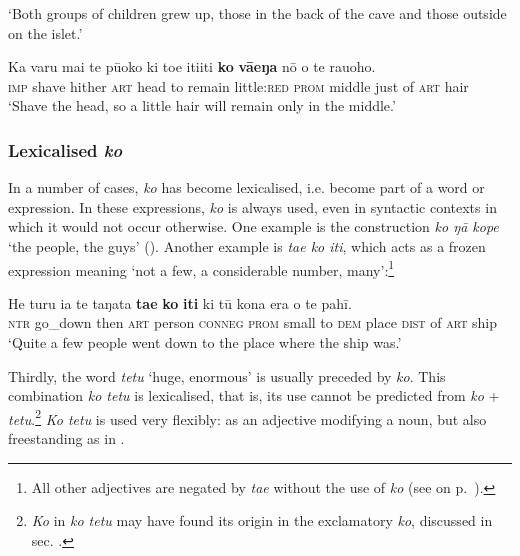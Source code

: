 \glt 
‘Both groups of children grew up, those in the back of the cave and those outside on the islet.’ \textstyleExampleref{[Mtx-3-01.293]}
\z

\ea\label{ex:4.326}
\gll Ka varu mai te pū{\ꞌ}oko ki toe {\ꞌ}iti{\ꞌ}iti \textbf{ko} \textbf{vāeŋa} nō o te rau{\ꞌ}oho. \\
\textsc{imp} shave hither \textsc{art} head to remain little:\textsc{red} \textsc{prom} middle just of \textsc{art} hair \\

\glt 
‘Shave the head, so a little hair will remain only in the middle.’ \textstyleExampleref{[Ley-6-44.033]}
\z

\subsubsection[Lexicalised ko]{Lexicalised \textit{ko}}\label{sec:4.7.11.3}

In a number of cases, \textit{ko} has become lexicalised, i.e. become part of a word or expression. In these expressions, \textit{ko} is always used, even in syntactic contexts in which it would not occur otherwise. One example is the construction \textit{ko ŋā kope} ‘the people, the guys’ (). Another example is \textit{ta{\ꞌ}e ko {\ꞌ}iti}, which acts as a frozen expression meaning ‘not a few, a considerable number, many’:\footnote{\label{fn:242}All other adjectives are negated by \textit{ta{\ꞌ}e} without the use of \textit{ko} (see  on p.~\pageref{ex:10.147}).}

\ea\label{ex:4.327}
\gll He turu ia te taŋata \textbf{ta{\ꞌ}e} \textbf{ko} \textbf{{\ꞌ}iti} ki tū kona era o te pahī. \\
\textsc{ntr} go\_down then \textsc{art} person \textsc{conneg} \textsc{prom} small to \textsc{dem} place \textsc{dist} of \textsc{art} ship \\

\glt
‘Quite a few people went down to the place where the ship was.’ \textstyleExampleref{[R250.211]} 
\z

Thirdly, the word \textit{tetu} ‘huge, enormous’ is usually preceded by \textit{ko}. This combination \textit{ko tetu} is lexicalised, that is, its use cannot be predicted from \textit{ko} + \textit{tetu}.\footnote{\label{fn:243}\textit{Ko} in \textit{ko tetu} may have found its origin in the exclamatory \textit{ko}, discussed in sec. .} \textit{Ko tetu} is used very flexibly: as an adjective modifying a noun, but also freestanding as in .

